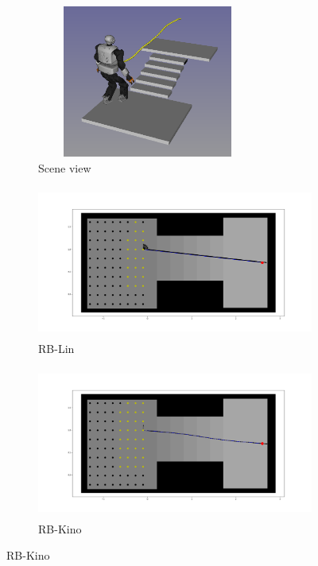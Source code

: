 \begin{figure}[ht]
    \centering
    \captionsetup[subfigure]{justification=centering}
    \begin{subfigure}[t]{0.49\linewidth}
    \centering
    \includegraphics[width=0.8\textwidth, height=5cm]{Figures/Chapter_LEAS/stairs_exemple.png}
    \caption{Scene view}
    \label{fig:stairs_p1:scene}
    \end{subfigure}
    \begin{subfigure}[t]{0.49\linewidth}
    \includegraphics[width=\textwidth, height=5cm,trim={2cm 2cm 2cm 2cm},clip]{Figures/Chapter_LEAS/stairs_lin_p1_90.png}
    \caption{RB-Lin}
    \label{fig:leas:stairs_p1_lin}
    \end{subfigure}
    \begin{subfigure}[t]{0.49\linewidth}
    \includegraphics[width=\textwidth, height=5cm,trim={2cm 2cm 2cm 2cm},clip]{Figures/Chapter_LEAS/stairs_kino_p1_90.png}
    \caption{RB-Kino}
    \label{fig:leas:stairs_p1_kino}

\end{subfigure}
\end{figure}
